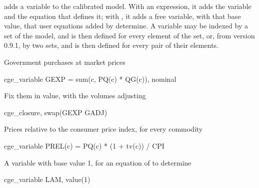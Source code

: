 

 adds a variable to the calibrated model. With an expression,
it adds the variable and the equation that defines it; with , it
adds a free variable, with that base value, that user equations added by
 determine. A variable may be indexed by a set of the
model, and is then defined for every element of the set, or, from version
0.9.1, by two sets, and is then defined for every pair of their elements.


Government purchases at market prices
\begin{stcode}
cge_variable GEXP = sum(c, PQ(c) * QG(c)), nominal
\end{stcode}
Fix them in value, with the volumes adjusting
\begin{stcode}
cge_closure, swap(GEXP GADJ)
\end{stcode}
Prices relative to the consumer price index, for every commodity
\begin{stcode}
cge_variable PREL(c) = PQ(c) * (1 + tv(c)) / CPI
\end{stcode}
A variable with base value 1, for an equation of  to
determine
\begin{stcode}
cge_variable LAM, value(1)
\end{stcode}


